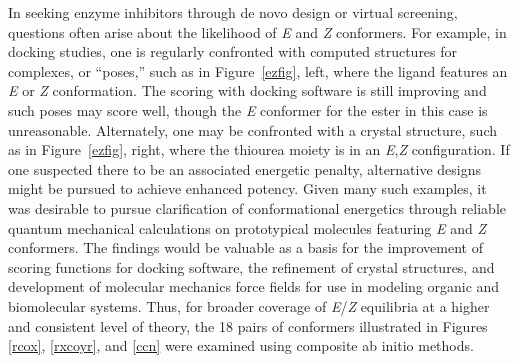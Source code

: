 \documentclass[12pt]{report}
\def\figlab{Figure}\def\figslab{\figlab s}
\newcommand*\fig[1]{\figlab~\ref{#1}}
\begin{document}
In seeking enzyme inhibitors through de novo design or virtual screening,\cite{klebe,jez} questions often arise about the likelihood of \textit{E} and \textit{Z} conformers. For example, in docking studies, one is regularly confronted with computed structures for complexes, or ``poses,'' such as in \fig{ezfig}, left, where the ligand features an \textit{E} or \textit{Z} conformation. The scoring with docking software is still improving and such poses may score well,\cite{nichols} though the \textit{E} conformer for the ester in this case is unreasonable.\cite{brameld} Alternately, one may be confronted with a crystal structure, such as in \fig{ezfig}, right, where the thiourea moiety is in an \textit{E},\textit{Z} configuration.\cite{ren} If one suspected there to be an associated energetic penalty, alternative designs might be pursued to achieve enhanced potency. Given many such examples, it was desirable to pursue clarification of conformational energetics through reliable quantum mechanical calculations on prototypical molecules featuring \textit{E} and \textit{Z} conformers. The findings would be valuable as a basis for the improvement of scoring functions for docking software,\cite{leach} the refinement of crystal structures, and development of molecular mechanics force fields for use in modeling organic and biomolecular systems.\cite{ponder,jjez} Thus, for broader coverage of \textit{E}/\textit{Z} equilibria at a higher and consistent level of theory, the 18 pairs of conformers illustrated in Figures \ref{rcox}, \ref{rxcoyr}, and \ref{ccn} were examined using composite ab initio methods.
\end{document}

